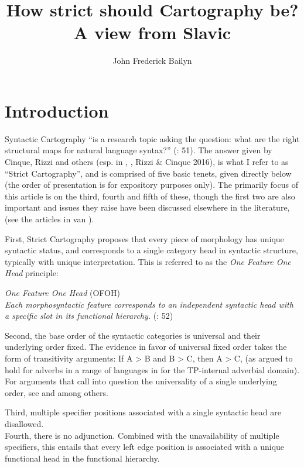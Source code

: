 \documentclass[output=paper,colorlinks,citecolor=brown,
]{langscibook}
\author{John Frederick Bailyn\affiliation{Stony Brook University}\orcid{}}
\title{How strict should Cartography be? A view from Slavic}
\begin{document}
\maketitle

\section{Introduction}
Syntactic Cartography “is a research topic asking the question: what are the right structural maps for natural language syntax?” (\citealt{CinqueRizzi2010}: 51). The answer given by Cinque, Rizzi and others (esp. in \citealt{Cinque1999}, \citealt{CinqueRizzi2010}, Rizzi \& Cinque 2016), is what I refer to as “Strict Cartography”, and is comprised of five basic tenets, given directly below (the order of presentation is for expository purposes only). The primarily focus of this article is on the third, fourth and fifth of these, though the first two are also important and issues they raise have been discussed elsewhere in the literature, (see the articles in van \citealt{Craenenbroeck2009}). 

First, Strict Cartography proposes that every piece of morphology has unique syntactic status, and corresponds to a single category head in syntactic structure, typically with unique interpretation. This is referred to as the \textit{One Feature One Head} principle: 


\begin{exe}
\ex \label{bai1}
\emph{One Feature One Head} (OFOH) \\
\emph{Each morphosyntactic feature corresponds to an independent  syntactic head with a specific slot in its functional hierarchy.} (\citealt{CinqueRizzi2010}: 52)
\end{exe}

Second, the base order of the syntactic categories is universal and their underlying order fixed. The evidence in favor of universal fixed order takes the form of transitivity arguments: If A > B and B > C, then A > C, (as argued to hold for adverbs in a range of languages in \citealt{Cinque1999} for the TP-internal adverbial domain). For arguments that call into question the universality of a single underlying order, see \citealt{Bobaljik1999} and \citealt{Nilsen2003} among others. 

Third, multiple specifier positions associated with a single syntactic head are disallowed. \\ 

Fourth, there is no adjunction. Combined with the unavailability of multiple specifiers, this entails that every left edge position is associated with a unique functional head in the functional hierarchy. 
\end{document}
